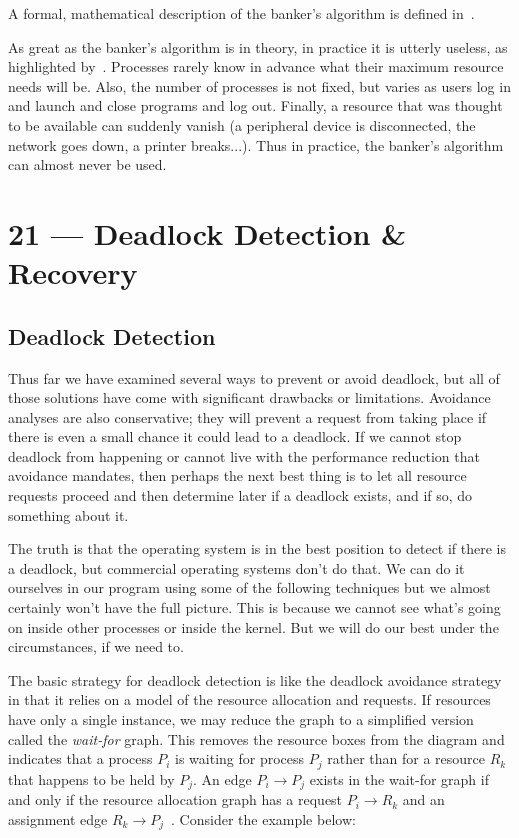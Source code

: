 \documentclass[a4paper]{report}
\begin{document}
A formal, mathematical description of the banker's algorithm is defined in~\cite{osc}.

As great as the banker's algorithm is in theory, in practice it is utterly useless, as highlighted by~\cite{mos}. Processes rarely know in advance what their maximum resource needs will be. Also, the number of processes is not fixed, but varies as users log in and launch and close programs and log out. Finally, a resource that was thought to be available can suddenly vanish (a peripheral device is disconnected, the network goes down, a printer breaks...). Thus in practice, the banker's algorithm can almost never be used.









\chapter*{21 --- Deadlock Detection \& Recovery}


\section*{Deadlock Detection}
Thus far we have examined several ways to prevent or avoid deadlock, but all of those solutions have come with significant drawbacks or limitations. Avoidance analyses are also conservative; they will prevent a request from taking place if there is even a small chance it could lead to a deadlock. If we cannot stop deadlock from happening or cannot live with the performance reduction that avoidance mandates, then perhaps the next best thing is to let all resource requests proceed and then determine later if a deadlock exists, and if so, do something about it.

The truth is that the operating system is in the best position to detect if there is a deadlock, but commercial operating systems don't do that. We can do it ourselves in our program using some of the following techniques but we almost certainly won't have the full picture. This is because we cannot see what's going on inside other processes or inside the kernel. But we will do our best under the circumstances, if we need to.

The basic strategy for deadlock detection is like the deadlock avoidance strategy in that it relies on a model of the resource allocation and requests. If resources have only a single instance, we may reduce the graph to a simplified version called the \textit{wait-for} graph. This removes the resource boxes from the diagram and indicates that a process $P_{i}$ is waiting for process $P_{j}$ rather than for a resource $R_{k}$ that happens to be held by $P_{j}$. An edge $P_{i} \rightarrow P_{j}$ exists in the wait-for graph if and only if the resource allocation graph has a request $P_{i} \rightarrow R_{k}$ and an assignment edge $R_{k} \rightarrow P_{j}$~\cite{osc}. Consider the example below:
\end{document}

